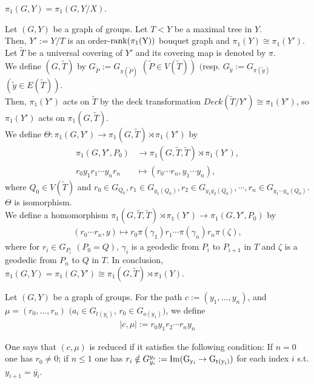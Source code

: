 \begin{remark}
  $\pi_1(G,Y) = \pi_1(G,Y/X)$.
\end{remark}

\begin{remark}
  Let $(G,Y)$ be a graph of groups.
  Let $T < Y$ be a maximal tree in $Y$.\\
  Then, $Y' := Y/T$ is an order-$\rm{rank}(\pi_1(Y))$ bouquet graph and $\pi_1(Y) \cong \pi_1(Y')$. \\
  Let $\tilde{T}$ be a universal covering of $Y'$ and its covering map is denoted by $\pi$.\\
  We define $(G,\tilde{T})$ by
  $G_{\tilde{P}} := G_{\pi(\tilde{P})}$ $(\tilde{P} \in V(\tilde{T}))$
  $($resp. $G_{\tilde{y}} := G_{\pi(\tilde{y})}$ $(\tilde{y} \in E(\tilde{T}))$.\\
  Then, $\pi_1(Y')$ acts on $\tilde{T}$ by the deck transformation $Deck(\tilde{T}/Y') \cong \pi_1(Y')$,
  so $\pi_1(Y')$ acts on $\pi_1(G,\tilde{T})$.\\
  We define $\Theta:\pi_1(G,Y')\rightarrow \pi_1(G,\tilde{T}) \rtimes \pi_1(Y')$
  by
  \begin{align*}
    \pi_1(G,Y',P_0) &\rightarrow \pi_1(G,\tilde{T},\tilde{T}) \rtimes \pi_1(Y'), \\
    r_0 y_1 r_1 \cdots y_n r_n &\mapsto (r_0 \cdots r_n , y_1 \cdots y_n), 
  \end{align*}
  where $Q_0 \in V(\tilde{T})$ and $r_0 \in G_{Q_0}, r_1 \in G_{y_1 (Q_0)}, r_2 \in G_{y_1 y_2 (Q_0)}, \cdots, r_n \in G_{y_1 \cdots y_n (Q_0)}$. 
  $\Theta$ is isomorphism.\\
  We define a homomorphism $\pi_1(G,\tilde{T},\tilde{T}) \rtimes \pi_1(Y') \rightarrow \pi_1(G,Y',P_0)$ by
  \begin{align*}
    (r_0 \cdots r_n , y) \mapsto r_0 \pi(\gamma_{1}) r_1 \cdots \pi(\gamma_n) r_n \pi(\zeta),
  \end{align*}
  where for $r_i \in G_{P_i}$ $(P_0 = Q)$, $\gamma_i$ is a geodedic from $P_i$ to $P_{i+1}$ in $T$ and $\zeta$ is a geodedic from $P_n$ to $Q$ in $T$.
  In conclusion, $\pi_1(G,Y) = \pi_1(G,Y') \cong \pi_1(G,\tilde{T}) \rtimes \pi_1(Y)$.
\end{remark}


\begin{definition}
  Let $(G,Y)$ be a graph of groups.
  For the path $c := (y_1, \ldots, y_n)$, and $\mu = (r_0, \ldots, r_n)$ $(a_i \in G_{t(y_i)}$, $r_0 \in G_{o(y_1)})$,
  we define
  \begin{align*}
    |c,\mu| := r_0 y_1 r_2 \cdots r_n y_n
  \end{align*}

  One says that $(c,\mu)$ is reduced if it satisfies the following condition: 
  If $n=0$ one has $r_0 \neq 0$; if $n \leq 1$ one has $r_i \notin G_{y_i}^{y_i} := \rm{Im}(G_{y_i} \rightarrow G_{t(y_i)})$ for each index $i$ s.t. $y_{i+1} = \overline{y_i}$. 
\end{definition}

